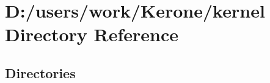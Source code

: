 \section{D\+:/users/work/\+Kerone/kernel Directory Reference}
\label{dir_dc43877d82dd332f9fb2071fcca799d6}
\subsection*{Directories}
\begin{DoxyCompactItemize}
\end{DoxyCompactItemize}
